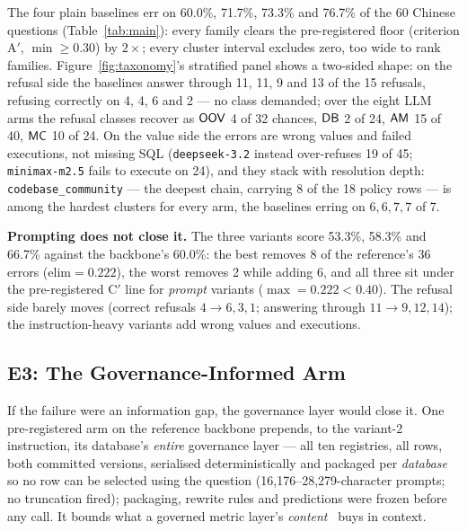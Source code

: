  The four plain baselines err on 60.0\%, 71.7\%, 73.3\% and 76.7\% of the
60 Chinese questions (Table~\ref{tab:main}): every family clears the pre-registered
floor (criterion A$'$, $\min\geq0.30$) by
$2\times$; every cluster interval excludes zero, too
wide to rank families. Figure~\ref{fig:taxonomy}'s stratified panel shows a
two-sided shape: on
the refusal side the baselines answer through 11, 11, 9 and 13 of the
15 refusals, refusing correctly on 4, 4, 6 and 2 --- no class
demanded; over the eight LLM arms the refusal classes
recover as $\mathsf{OOV}$ 4 of 32 chances, $\mathsf{DB}$ 2 of 24, $\mathsf{AM}$ 15 of 40, $\mathsf{MC}$ 10
of 24. On
the value side the
errors are wrong values and failed
executions, not missing SQL (\texttt{deepseek-3.2} instead over-refuses 19
of 45; \texttt{minimax-m2.5} fails to execute on 24),
and they stack with resolution depth: \texttt{codebase\_community} --- the
deepest chain, carrying 8 of
the 18 policy rows --- is among the hardest
clusters for every arm, the baselines erring on $6,6,7,7$ of 7.

\smallskip\noindent{}\textbf{Prompting does not close it.} The three variants
score 53.3\%, 58.3\% and 66.7\% against the backbone's 60.0\%: the best
removes 8 of the reference's 36 errors ($\mathrm{elim}=0.222$), the worst
removes 2 while adding 6, and all three
sit under the pre-registered C$'$ line for \emph{prompt} variants
($\max=0.222<0.40$). The refusal side barely moves (correct refusals
$4\to6,3,1$; answering through $11\to9,12,14$); the instruction-heavy variants
add wrong values and executions.

\subsection{E3: The Governance-Informed Arm}
\label{sec:eval-gov}

 If the failure were an information gap, the governance layer would close it. One pre-registered arm on the reference backbone prepends, to the
variant-2 instruction, its database's \emph{entire} governance layer ---
all ten registries, all rows, both committed versions, serialised
deterministically and packaged per \emph{database} so no row can be selected
using the question (16{,}176--28{,}279-character prompts; no truncation
fired); packaging, rewrite rules and predictions were frozen before any call.
It bounds what a governed metric layer's
\emph{content}~\cite{semlayerbench} buys in context.

